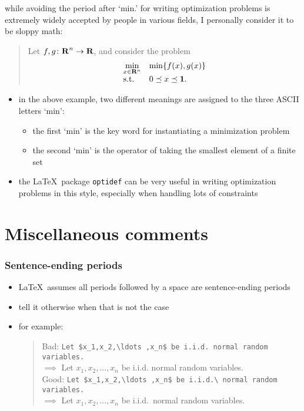 \documentclass[usepdftitle=false]{beamer}
\begin{document}
\begin{frame}[t]
    \vspace*{1cm}

    while avoiding the period after `min.' for writing optimization problems is extremely widely accepted by people in various fields, I personally consider it to be sloppy math:
        \begin{quote}
        Let $f, g \colon {\bf R{}}^n \to {\bf R{}}$, and consider the problem
        \[
            \begin{array}{ll}
                \underset{x \in {\bf R{}}^n}{\min}   & \min \{f(x), g(x)\} \\
                \mbox{s.t.} & 0 \preceq x \preceq \mathbf{1}.
            \end{array}
        \]
    \end{quote}
    \begin{itemize}\itemsep=12pt
        \item in the above example, two different meanings are assigned to the three ASCII letters `min':
            \begin{itemize}\itemsep=6pt
                \item the first `min' is the key word for instantiating a minimization problem
                \item the second `min' is the operator of taking the smallest element of a finite set
            \end{itemize}
        \item the \LaTeX\ package \texttt{optidef} can be very useful in writing optimization problems in this style, especially when handling lots of constraints
    \end{itemize}
\end{frame}

\section{Miscellaneous comments}
\begin{frame}[fragile]
    \frametitle{Sentence-ending periods}

    \begin{itemize}\itemsep=12pt
        \item \LaTeX\ assumes all periods followed by a space are sentence-ending periods
        \item tell it otherwise when that is not the case
        \item for example:
            \begin{quote}
                Bad: \verb+Let $x_1,x_2,\ldots ,x_n$ be i.i.d. normal random variables.+\\
                \quad $\implies$ Let $x_1,x_2,\ldots ,x_n$ be i.i.d. normal random variables.\\
                Good: \verb+Let $x_1,x_2,\ldots ,x_n$ be i.i.d.\ normal random variables.+\\
                \quad $\implies$ Let $x_1,x_2,\ldots ,x_n$ be i.i.d.\ normal random variables.
            \end{quote}
    \end{itemize}
\end{frame}
\end{document}

